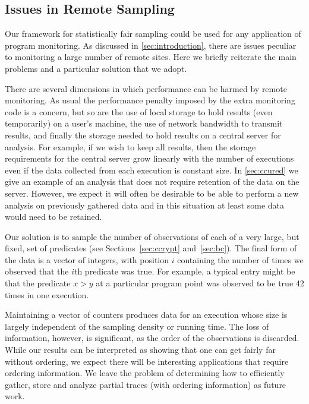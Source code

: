 \subsection{Issues in Remote Sampling}
\label{sec-compression}

Our framework for statistically fair sampling could be used for any
application of program monitoring.  As discussed in
\autoref{sec:introduction}, there are issues peculiar to
monitoring a large number of remote sites.  Here we briefly reiterate
the main problems and a particular solution that we adopt.

There are several dimensions in which performance can be harmed by
remote monitoring.  As usual the performance penalty imposed by the
extra monitoring code is a concern, but so are the use of local
storage to hold results (even temporarily) on a user's machine, the
use of network bandwidth to transmit results, and finally the storage
needed to hold results on a central server for analysis.  For example,
if we wish to keep all results, then the storage requirements for the
central server grow linearly with the number of executions even if the
data collected from each execution is constant size.  In
\autoref{sec:ccured} we give an example of an analysis that does not
require retention of the data on the server.  However, we expect it
will often be desirable to be able to perform a new analysis on
previously gathered data and in this situation at least some data
would need to be retained.

Our solution is to sample the number of observations of each of a very
large, but fixed, set of predicates (see Sections~\ref{sec:ccrypt}
and~\ref{sec:bc}).  The final form of the data is a vector of
integers, with position $i$ containing the number of times we observed
that the $i$th predicate was true.  For example, a typical entry might
be that the predicate $x > y$ at a particular program point was
observed to be true 42 times in one execution.

Maintaining a vector of counters produces data for an execution whose
size is largely independent of the sampling density or running time.
The loss of information, however, is significant, as the order
of the observations is discarded.  While our results can be interpreted
as showing that one can get fairly far without ordering, we expect
there will be interesting applications that require ordering information.
We leave the problem of determining how to efficiently gather, store and
analyze partial traces (with ordering information) as future work.
